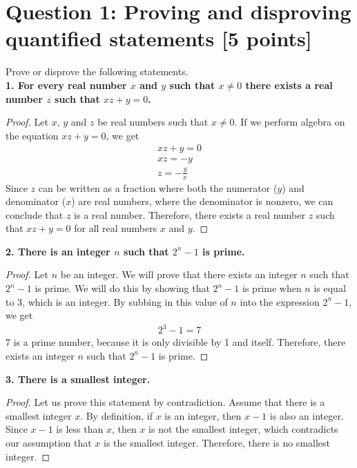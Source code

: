 \documentclass{report}
\theoremstyle{mytheoremstyle}
\theoremstyle{mytheoremstyle}
\theoremstyle{myproblemstyle}
\begin{document}
\section*{\Large{Question 1: Proving and disproving quantified statements [5 points]}}
Prove or disprove the following statements.
\\[\baselineskip]
\textbf{1. For every real number $x$ and $y$ such that $x \neq 0$ there exists a real number $z$ such that $xz+y=0$.}
\begin{proof}
Let $x$, $y$ and $z$ be real numbers such that $x \neq 0$. If we perform algebra on the equation $xz+y=0$, we get 
\begin{align}
xz+y = 0 \\
xz = -y \\
z = -\frac{y}{x}
\end{align}
Since $z$ can be written as a fraction where both the numerator ($y$) and denominator ($x$) are real numbers, where the denominator is nonzero, we can conclude that $z$ is a real number. Therefore, there exists a real number $z$ such that $xz+y=0$ for all real numbers $x$ and $y$.
\end{proof}
\textbf{2. There is an integer $n$ such that $2^n-1$ is prime.}
\begin{proof}
Let $n$ be an integer. We will prove that there exists an integer $n$ such that $2^n-1$ is prime. We will do this by showing that $2^n-1$ is prime when $n$ is equal to $3$, which is an integer. By subbing in this value of $n$ into the expression $2^n-1$, we get 
\begin{align}
2^3-1=7
\end{align}
7 is a prime number, because it is only divisible by 1 and itself. Therefore, there exists an integer $n$ such that $2^n-1$ is prime.
\end{proof}
\textbf{3. There is a smallest integer.}
\begin{proof}
Let us prove this statement by contradiction. Assume that there is a smallest integer $x$. By definition, if $x$ is an integer, then $x-1$ is also an integer. Since $x-1$ is less than $x$, then $x$ is not the smallest integer, which contradicts our assumption that $x$ is the smallest integer. Therefore, there is no smallest integer.
\end{proof}
\newpage
\end{document}
